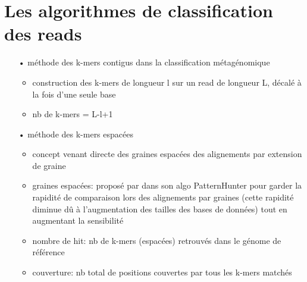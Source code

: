 \section{Les algorithmes de classification des reads}

	\begin{itemize}
		\item[•] méthode des k-mers contigus dans la classification métagénomique
                  \begin{itemize}
                  \item construction des k-mers de longueur l sur un read de longueur L, décalé à la fois d'une seule base
                  \item nb de k-mers = L-l+1
                  \end{itemize}
		\item[•] méthode des k-mers espacées
                  \begin{itemize}
                  \item concept venant directe des graines espacées des alignements par extension de graine
                  \item graines espacées: proposé par \cite{Ma2002} dans son algo PatternHunter pour garder la rapidité de comparaison lors des alignements par graines (cette rapidité diminue dû à l'augmentation des tailles des bases de données) tout en augmentant la sensibilité
                  \item nombre de hit: nb de k-mers (espacées) retrouvés dans le génome de référence
                  \item couverture: nb total de positions couvertes par tous les k-mers matchés
                  \end{itemize} 
	\end{itemize}